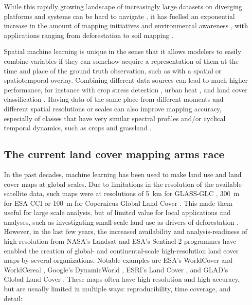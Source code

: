         While this rapidly growing landscape of increasingly large datasets on diverging platforms and systems can be hard to navigate \citep{wagemann2021a}, it has fuelled an exponential increase in the amount of mapping initiatives and environmental awareness \citep{wulder2022fifty}, with applications ranging from deforestation \citep{hansen2013high} to soil mapping \citep{hengl2017soilgrids250m}.
        
        Spatial machine learning is unique in the sense that it allows modelers to easily combine variables if they can somehow acquire a representation of them at the time and place of the ground truth observation, such as with a spatial or spatiotemporal overlay. Combining different data sources can lead to much higher performance, for instance with crop stress detection  \citep{berger2022multi}, urban heat \citep{shahi2015novel}, and land cover classification \citep{zhu2016optimizing, hurskainen2019auxiliary, hosseiny2022urban,xu20183d}. Having data of the same place from different moments \citep{low2013impact} and different spatial resolutions or scales \citep{santos2012multiscale} can also improve mapping accuracy, especially of classes that have very similar spectral profiles and/or cyclical temporal dynamics, such as crops and grassland \citep{esch2014differentiation}.

\subsection*{The current land cover mapping arms race}

   In the past decades, machine learning has been used to make land use and land cover maps at global scales. Due to limitations in the resolution of the available satellite data, such maps were at resolutions of 5~km for GLASS-GLC \citep{liu2020annual}, 300~m for ESA CCI \citep{defourny2012land} or 100~m for Copernicus Global Land Cover \citep{buchhorn2020copernicus}. This made them useful for large scale analysis, but of limited value for local applications and analyses, such as investigating small-scale land use as drivers of deforestation \citep{masolele2024mapping}. However, in the last few years, the increased availability and analysis-readiness of high-resolution from NASA's Landsat and ESA's Sentinel-2 programmes have enabled the creation of global- and continental-scale high-resolution land cover maps by several organizations. Notable examples are ESA's WorldCover \citep{kerchove2021esa} and WorldCereal \citep{tricht2023worldcereal}, Google's DynamicWorld \citep{brown2022dynamic}, ESRI's Land Cover \citep{karra2021global}, and GLAD's Global Land Cover \citep{potapov2022global}.
    These maps often have high resolution and high accuracy, but are usually limited in multiple ways: reproducibility, time coverage, and detail:
    
